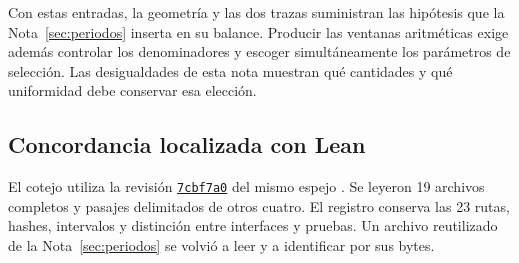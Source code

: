 Con estas entradas, la geometría y las dos trazas suministran
las hipótesis que la Nota~\ref{sec:periodos} inserta en su
balance. Producir las ventanas aritméticas exige además
controlar los denominadores y escoger simultáneamente los
parámetros de selección. Las desigualdades de esta nota
muestran qué cantidades y qué uniformidad debe conservar
esa elección.

\subsection{Concordancia localizada con Lean}
\label{subsec:geometria-lean}

El cotejo utiliza la revisión
\href{https://github.com/CocoSgt/riemann-hypothesis-lean/tree/7cbf7a0c32fca1badf05931879a37c3f8a2b03b4}{\texttt{7cbf7a0}}
del mismo espejo \cite{lean}.
Se leyeron 19 archivos completos y pasajes delimitados de
otros cuatro. El registro conserva las 23 rutas, hashes,
intervalos y distinción entre interfaces y pruebas.
Un archivo reutilizado de la Nota~\ref{sec:periodos} se
volvió a leer y a identificar por sus bytes.

